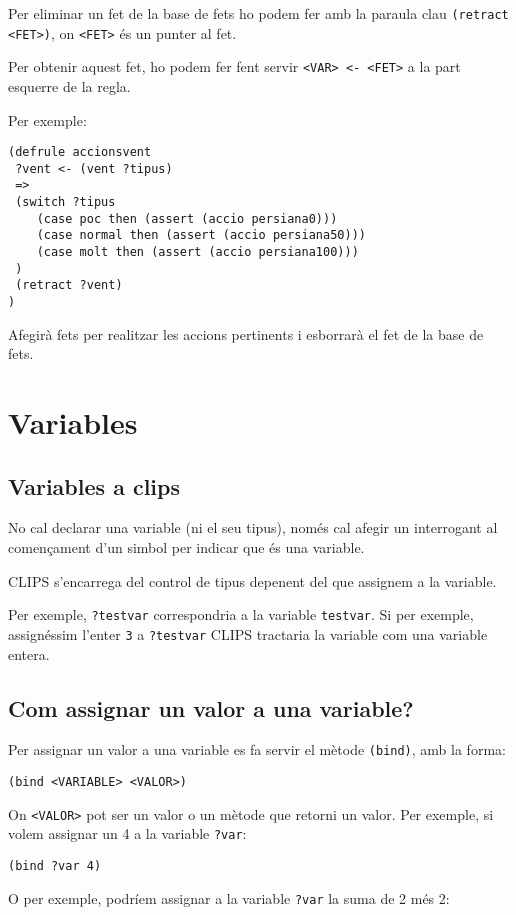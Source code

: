 \documentclass[11pt,svgnames]{scrbook}
\begin{document}
Per eliminar un fet de la base de fets ho podem fer amb la paraula clau
\texttt{(retract
<FET>)}, on \texttt{<FET>} és un punter al fet.

Per obtenir aquest fet, ho podem fer fent servir \texttt{<VAR> <- <FET>} a la
part esquerre de la regla.

Per exemple:

\begin{verbatim}
(defrule accionsvent
 ?vent <- (vent ?tipus)
 =>
 (switch ?tipus
    (case poc then (assert (accio persiana0)))
    (case normal then (assert (accio persiana50)))
    (case molt then (assert (accio persiana100)))
 )
 (retract ?vent)
)
\end{verbatim}

Afegirà fets per realitzar les accions pertinents i esborrarà el fet de la base
de fets.


\section{Variables}
\subsection{Variables a clips}


No cal declarar una variable (ni el seu tipus), només cal afegir un interrogant
al començament d'un simbol per indicar que és una variable.

CLIPS s'encarrega del control de tipus depenent del que assignem a la variable.

Per exemple, \texttt{?testvar} correspondria a la variable \texttt{testvar}. Si
per exemple, assignéssim l'enter \texttt{3} a \texttt{?testvar} CLIPS tractaria
la variable com una variable entera.

\subsection{Com assignar un valor a una variable?}


Per assignar un valor a una variable es fa servir el mètode \texttt{(bind)}, amb
la forma:
\medskip

\texttt{(bind <VARIABLE> <VALOR>)}
\medskip

On \texttt{<VALOR>} pot ser un valor o un mètode que retorni un valor.
Per exemple, si volem assignar un 4 a la variable \texttt{?var}:
\medskip

\texttt{(bind ?var 4)}
\medskip

O per exemple, podríem assignar a la variable \texttt{?var} la suma de 2 més 2:
\medskip
\end{document}
